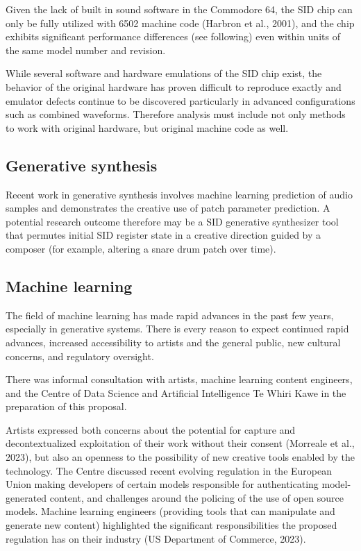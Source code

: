 \documentclass[10pt]{article}
\begin{document}
\begin{multicols*}{2}
Given the lack of built in sound software in the Commodore 64, the SID chip can only be fully utilized with 6502 machine code (Harbron et al., 2001), and the chip exhibits significant performance differences (see following) even within units of the same model number and revision.

While several software and hardware emulations of the SID chip exist, the behavior of the original hardware has proven difficult to reproduce exactly and emulator defects continue to be discovered particularly in advanced configurations such as combined waveforms\cite{fixcombwaveforms}. Therefore analysis must include not only methods to work with original hardware, but original machine code as well.

\subsection{Generative synthesis}

Recent work in generative synthesis\cite{neurorack} involves machine learning prediction of audio samples and demonstrates the creative use of patch parameter prediction. A potential research outcome therefore may be a SID generative synthesizer tool that permutes initial SID register state in a creative direction guided by a composer (for example, altering a snare drum patch over time).

\subsection{Machine learning}

The field of machine learning has made rapid advances in the past few years, especially in generative systems. There is every reason to expect continued rapid advances, increased accessibility to artists and the general public, new cultural concerns, and regulatory oversight.

There was informal consultation with artists, machine learning content engineers, and the Centre of Data Science and Artificial Intelligence Te Whiri Kawe in the preparation of this proposal.

Artists expressed both concerns about the potential for capture and decontextualized exploitation of their work without their consent (Morreale et al., 2023), but also an openness to the possibility of new creative tools enabled by the technology\cite{creativityai}. The Centre discussed recent evolving regulation in the European Union making developers of certain models responsible for authenticating model-generated content\cite{euairegs}, and challenges around the policing of the use of open source models. Machine learning engineers (providing tools that can manipulate and generate new content) highlighted the significant responsibilities the proposed regulation has on their industry (US Department of Commerce, 2023).


\end{multicols*}
\end{document}
